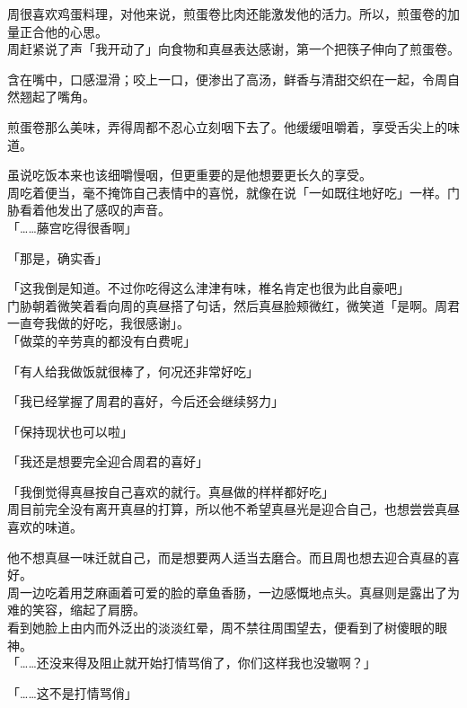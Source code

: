 周很喜欢鸡蛋料理，对他来说，煎蛋卷比肉还能激发他的活力。所以，煎蛋卷的加量正合他的心思。\\

周赶紧说了声「我开动了」向食物和真昼表达感谢，第一个把筷子伸向了煎蛋卷。

含在嘴中，口感湿滑；咬上一口，便渗出了高汤，鲜香与清甜交织在一起，令周自然翘起了嘴角。

煎蛋卷那么美味，弄得周都不忍心立刻咽下去了。他缓缓咀嚼着，享受舌尖上的味道。

虽说吃饭本来也该细嚼慢咽，但更重要的是他想要更长久的享受。\\

周吃着便当，毫不掩饰自己表情中的喜悦，就像在说「一如既往地好吃」一样。门胁看着他发出了感叹的声音。\\

「……藤宫吃得很香啊」

「那是，确实香」

「这我倒是知道。不过你吃得这么津津有味，椎名肯定也很为此自豪吧」\\

门胁朝着微笑着看向周的真昼搭了句话，然后真昼脸颊微红，微笑道「是啊。周君一直夸我做的好吃，我很感谢」。\\

「做菜的辛劳真的都没有白费呢」

「有人给我做饭就很棒了，何况还非常好吃」

「我已经掌握了周君的喜好，今后还会继续努力」

「保持现状也可以啦」

「我还是想要完全迎合周君的喜好」

「我倒觉得真昼按自己喜欢的就行。真昼做的样样都好吃」\\

周目前完全没有离开真昼的打算，所以他不希望真昼光是迎合自己，也想尝尝真昼喜欢的味道。

他不想真昼一味迁就自己，而是想要两人适当去磨合。而且周也想去迎合真昼的喜好。\\

周一边吃着用芝麻画着可爱的脸的章鱼香肠，一边感慨地点头。真昼则是露出了为难的笑容，缩起了肩膀。\\

看到她脸上由内而外泛出的淡淡红晕，周不禁往周围望去，便看到了树傻眼的眼神。\\

「……还没来得及阻止就开始打情骂俏了，你们这样我也没辙啊？」

「……这不是打情骂俏」

